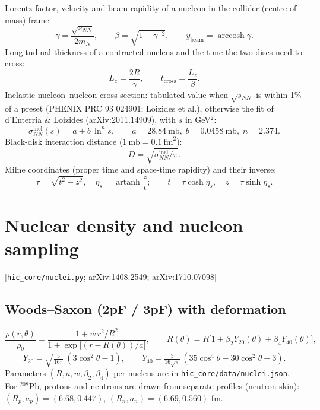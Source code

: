 \documentclass[11pt,a4paper]{article}
\newcommand{\file}[1]{\texttt{\small #1}}
\newcommand{\src}[1]{\hfill{\small\color{gray}[#1]}}
\begin{document}
Lorentz factor, velocity and beam rapidity of a nucleon in the collider (centre-of-mass) frame:
\begin{equation}
\gamma = \frac{\sqrt{s_{NN}}}{2m_N},\qquad \beta = \sqrt{1-\gamma^{-2}},\qquad y_\text{beam} = \operatorname{arccosh}\gamma .
\end{equation}
Longitudinal thickness of a contracted nucleus and the time the two discs need to cross:
\begin{equation}
L_z = \frac{2R}{\gamma},\qquad t_\text{cross} = \frac{L_z}{\beta}.
\end{equation}
Inelastic nucleon--nucleon cross section: tabulated value when $\sqrt{s_{NN}}$ is within 1\% of a preset
(PHENIX PRC 93 024901; Loizides et al.), otherwise the fit of d'Enterria \& Loizides
(arXiv:2011.14909), with $s$ in GeV$^2$:
\begin{equation}
\sigma^\text{inel}_{NN}(s) = a + b\,\ln^{n}\! s,\qquad a = 28.84~\text{mb},\; b = 0.0458~\text{mb},\; n = 2.374 .
\end{equation}
Black-disk interaction distance ($1~\text{mb} = 0.1~\text{fm}^2$):
\begin{equation}
D = \sqrt{\sigma^\text{inel}_{NN}/\pi}.
\end{equation}
Milne coordinates (proper time and space-time rapidity) and their inverse:
\begin{equation}
\tau = \sqrt{t^2-z^2},\quad \eta_s = \operatorname{artanh}\frac{z}{t};\qquad t = \tau\cosh\eta_s,\quad z = \tau\sinh\eta_s .
\end{equation}

\section{Nuclear density and nucleon sampling}
\src{\file{hic\_core/nuclei.py}; arXiv:1408.2549; arXiv:1710.07098}

\subsection{Woods--Saxon (2pF / 3pF) with deformation}
\begin{equation}
\frac{\rho(r,\theta)}{\rho_0} = \frac{1 + w\,r^2/R^2}{1+\exp\!\big[(r-R(\theta))/a\big]},\qquad
R(\theta) = R\big[1+\beta_2 Y_{20}(\theta)+\beta_4 Y_{40}(\theta)\big],
\end{equation}
\begin{equation}
Y_{20} = \sqrt{\tfrac{5}{16\pi}}\,(3\cos^2\theta-1),\qquad
Y_{40} = \tfrac{3}{16\sqrt{\pi}}\,(35\cos^4\theta-30\cos^2\theta+3).
\end{equation}
Parameters $(R,a,w,\beta_2,\beta_4)$ per nucleus are in \file{hic\_core/data/nuclei.json}. For $^{208}$Pb, protons and neutrons
are drawn from separate profiles (neutron skin): $(R_p,a_p)=(6.68,0.447)$, $(R_n,a_n)=(6.69,0.560)$ fm.
\end{document}
